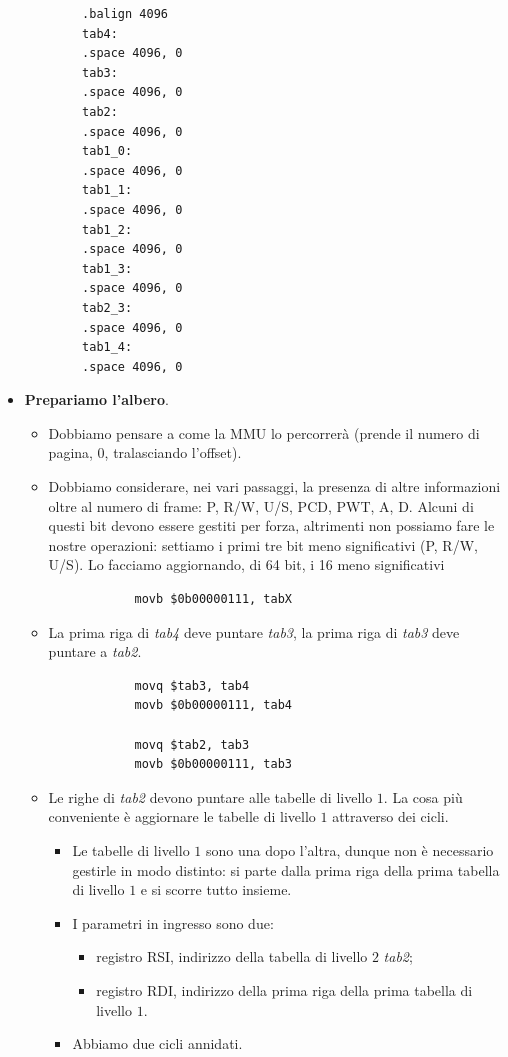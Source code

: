 \documentclass[11pt]{report}
\theoremstyle{definition}
\begin{document}
\begin{itemize}
\begin{multicols}{2}
\begin{verbatim}
		.balign 4096
		tab4:
		.space 4096, 0
		tab3:
		.space 4096, 0
		tab2:
		.space 4096, 0
		tab1_0:
		.space 4096, 0
		tab1_1:
		.space 4096, 0
		tab1_2:
		.space 4096, 0
		tab1_3:
		.space 4096, 0
		tab2_3:
		.space 4096, 0
		tab1_4:
		.space 4096, 0
	\end{verbatim}
\end{multicols}
	\item \textbf{Prepariamo l'albero}. 
	\begin{itemize}
		\item Dobbiamo pensare a come la MMU lo percorrerà (prende il numero di pagina, $0$, tralasciando l'offset). 
		\item Dobbiamo considerare, nei vari passaggi, la presenza di altre informazioni oltre al numero di frame: P, R/W, U/S, PCD, PWT, A, D. Alcuni di questi bit devono essere gestiti per forza, altrimenti non possiamo fare le nostre operazioni: settiamo i primi tre bit meno significativi (P, R/W, U/S). Lo facciamo aggiornando, di 64 bit, i 16 meno significativi
		\begin{verbatim}
			movb $0b00000111, tabX
		\end{verbatim}
		\item La prima riga di \emph{tab4} deve puntare \emph{tab3}, la prima riga di \emph{tab3} deve puntare a \emph{tab2}. 
		\begin{verbatim}
			movq $tab3, tab4
			movb $0b00000111, tab4
			
			movq $tab2, tab3
			movb $0b00000111, tab3
		\end{verbatim}
		\item Le righe di \emph{tab2} devono puntare alle tabelle di livello $1$. La cosa più conveniente è aggiornare le tabelle di livello $1$ attraverso dei cicli. 
		\begin{itemize}
			\item Le tabelle di livello $1$ sono una dopo l'altra, dunque non è necessario gestirle in modo distinto: si parte dalla prima riga della prima tabella di livello $1$ e si scorre tutto insieme.
			\item I parametri in ingresso sono due:
			\begin{itemize}
				\item registro RSI, indirizzo della tabella di livello $2$ \emph{tab2};
				\item registro RDI, indirizzo della prima riga della prima tabella di livello $1$.
			\end{itemize}
			\item Abbiamo due cicli annidati.
		\end{itemize}
		

\end{itemize}
\end{itemize}
\end{document}
